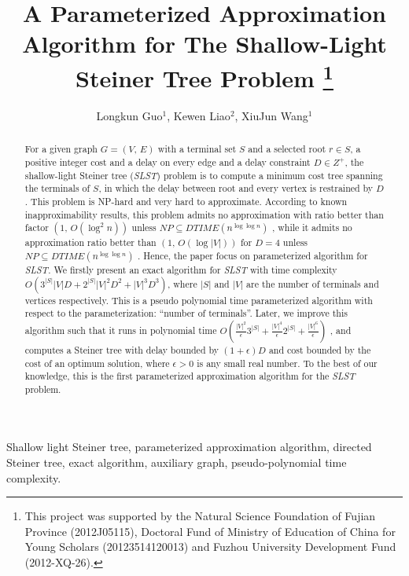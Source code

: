 \documentclass[english,runningheads,a4paper]{llncs}
\begin{document}
\title{A Parameterized Approximation Algorithm for The Shallow-Light Steiner
Tree Problem
\thanks{This project was supported by the Natural Science
Foundation of Fujian Province (2012J05115), Doctoral Fund of Ministry
of Education of China for Young Scholars (20123514120013) and Fuzhou
University Development Fund (2012-XQ-26). }
}
\author{{Longkun Guo$^{1}$, Kewen Liao$^{2}$}, XiuJun Wang$^{1}$}

\maketitle
\begin{abstract}
For a given graph $G=(V,\, E)$ with a terminal set $S$ and a selected
root $r\in S$, a positive integer cost and a delay on every edge
and a delay constraint $D\in Z^{+}$, the shallow-light Steiner tree
(\emph{SLST}) problem is to compute a minimum cost tree spanning the
terminals of $S$, in which the delay between root and every vertex
is restrained by $D$. This problem is NP-hard and very hard to approximate.
According to known inapproximability results, this problem admits
no approximation with ratio better than factor $(1,\, O(\log^{2}n))$
unless $NP\subseteq DTIME(n^{\log\log n})$ \cite{khandekar2013some},
while it admits no approximation ratio better than $(1,\, O(\log|V|))$
for $D=4$ unless $NP\subseteq DTIME(n^{\log\log n})$ \cite{bar2001generalized}.
Hence, the paper focus on parameterized algorithm for \emph{SLST}.
We firstly present an exact algorithm for \emph{SLST} with time complexity
$O(3^{|S|}|V|D+2^{|S|}|V|^{2}D^{2}+|V|^{3}D^{3})$, where $|S|$ and
$|V|$ are the number of terminals and vertices respectively. This
is a pseudo polynomial time parameterized algorithm with respect to
the parameterization: ``number of terminals''. Later, we improve
this algorithm such that it runs in polynomial time $O(\frac{|V|^{2}}{\epsilon}3^{|S|}+\frac{|V|^{4}}{\epsilon}2^{|S|}+\frac{|V|^{6}}{\epsilon})$
, and computes a Steiner tree with delay bounded by $(1+\epsilon)D$
and cost bounded by the cost of an optimum solution, where $\epsilon>0$
is any small real number. To the best of our knowledge, this is the
first parameterized approximation algorithm for the \emph{SLST} problem. \end{abstract}
\begin{keywords}
Shallow light Steiner tree, parameterized approximation algorithm,
directed Steiner tree, exact algorithm, auxiliary graph, pseudo-polynomial
time complexity.
\end{keywords}
\end{document}

